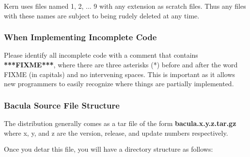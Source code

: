 Kern uses files named 1, 2, ... 9 with any extension as scratch files. Thus
any files with these names are subject to being rudely deleted at any time. 

\subsubsection*{When Implementing Incomplete Code}

Please identify all incomplete code with a comment that contains {\bf
***FIXME***}, where there are three asterisks (*) before and after the word
FIXME (in capitals) and no intervening spaces. This is important as it allows
new programmers to easily recognize where things are partially implemented. 

\subsubsection*{Bacula Source File Structure}

The distribution generally comes as a tar file of the form {\bf
bacula.x.y.z.tar.gz} where x, y, and z are the version, release, and update
numbers respectively. 

Once you detar this file, you will have a directory structure as follows: 

